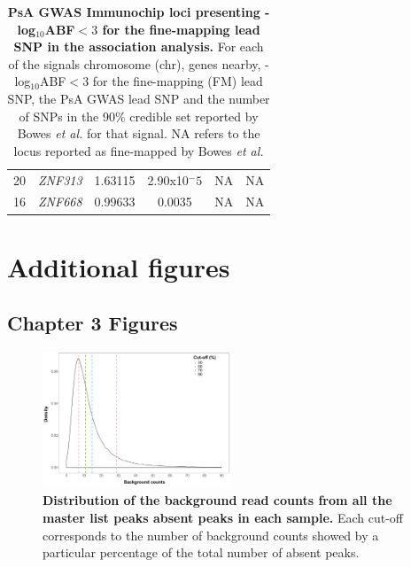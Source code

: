 \begin{table}[htbp]
\begin{tabular}{@{} c c c c c c}
20 & \textit{ZNF313}	 &	1.63115	 & 2.90x10${^-5}$ & NA & 	NA \\
16 & \textit{ZNF668}   &	0.99633	 & 0.0035 &	NA 	& NA \\
\bottomrule
\end{tabular}
\medskip %
\caption[PsA GWAS Immunochip loci presenting -log${_10}$ABF$<3$ for the fine-mapping lead SNP in the association analysis.]{\textbf{PsA GWAS Immunochip loci presenting -log${_10}$ABF$<3$ for the fine-mapping lead SNP in the association analysis.} For each of the signals chromosome (chr), genes nearby, -log${_10}$ABF$<3$ for the fine-mapping (FM) lead SNP, the PsA GWAS lead SNP and the number of SNPs in the 90\% credible set reported by Bowes \textit{et al.} for that signal. NA refers to the locus reported as fine-mapped by Bowes \textit{et al.}}
\label{tab:PsA_loci_no_fine_mapping}
\end{table}
\bigskip %




\chapter{Additional figures}
\label{app:Figures}

\section{Chapter 3 Figures}

\begin{figure}[htbp]
\centering
\includegraphics[width=0.5\textwidth]{./Appendix/pdfs/Chapter3/ATAC_absent_peaks_noise_distribution}
\caption[Distribution of the background read counts from all the master list peaks absent in each sample.]{\textbf{Distribution of the background read counts from all the master list peaks absent peaks in each sample.} Each cut-off corresponds to the number of background counts showed by a particular percentage of the total number of absent peaks.}
\label{figure:ATAC_absent_peaks_distribution}
\end{figure}




